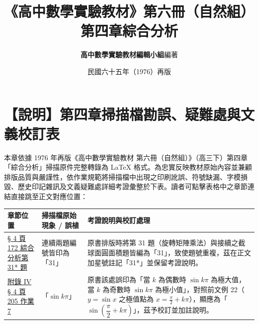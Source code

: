 \documentclass[a4paper,12pt,twoside]{article}
\title{\LARGE\textbf{《高中數學實驗教材》第六冊（自然組）}\\[0.5em] \Large\textbf{第四章\quad 綜合分析}}
\author{\textbf{高中數學實驗教材編輯小組}\quad 編著}
\date{民國六十五年（1976）再版}
\begin{document}
\maketitle
\thispagestyle{firstpage}

\section*{【說明】第四章掃描檔勘誤、疑難處與文義校訂表}
\label{sec:errata_notes_b6_ch4}
\label{sec:current_errata}

本章依據 1976 年再版《高中數學實驗教材 第六冊（自然組）》（高三下）第四章「綜合分析」掃描原件完整轉錄為 \LaTeX{} 格式。為忠實反映教材原始內容並兼顧排版品質與嚴謹性，依作業規範將掃描檔中出現之印刷訛誤、符號缺漏、字模損毀、歷史印記雜訊及文義疑難處詳細考證彙整於下表。讀者可點擊表格中之章節連結直接跳至正文對應位置：

\begin{table}[H]
\centering
\small
\renewcommand{\arraystretch}{1.35}
\begin{tabularx}{\textwidth}{|p{3.2cm}|p{3.8cm}|X|}
\hline
\textbf{章節位置} & \textbf{掃描檔原始現象 / 誤植} & \textbf{考證說明與校訂處理} \\ \hline

\hyperref[note:b6-ch4-p172-prob-dup]{§ 4 頁 172 綜合分析第 31* 題} & 
連續兩題編號皆印為「31」 & 
原書排版時將第 31 題（旋轉矩陣乘法）與接續之截球面圓面積題皆編為「31」，致使題號重複，茲在正文加星號註記「31*」並保留考證說明。 \\ \hline

\hyperref[note:b6-app4-p205-sin]{附錄 IV § 4 頁 205 作業 7} & 
「$\sin k\pi$」 & 
原書該處誤印為「當 $k$ 為偶數時 $\sin k\pi$ 為極大值，當 $k$ 為奇數時 $\sin k\pi$ 為極小值」，對照前文例 22（$y=\sin x$ 之極值點為 $x=\frac{\pi}{2}+k\pi$），顯應為「$\sin\left(\dfrac{\pi}{2}+k\pi\right)$」，茲予校訂並加註說明。 \\ \hline

\end{tabularx}
\end{table}

\newpage
\renewcommand{\contentsname}{目\qquad 次}
\tableofcontents
\newpage

\setcounter{section}{3}

\end{document}
